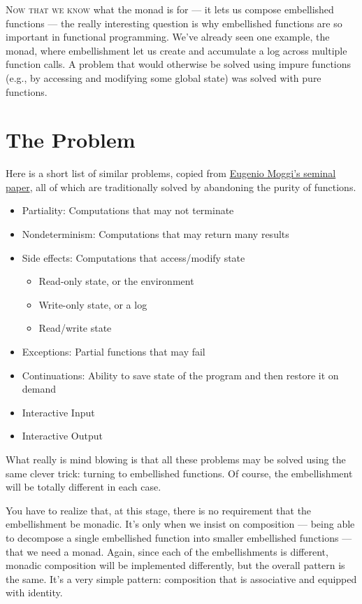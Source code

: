 \lettrine[lhang=0.17]{N}{ow that we know} what the monad is for --- it lets us compose
embellished functions --- the really interesting question is why
embellished functions are so important in functional programming. We've
already seen one example, the  monad, where embellishment
let us create and accumulate a log across multiple function calls. A
problem that would otherwise be solved using impure functions (e.g., by
accessing and modifying some global state) was solved with pure
functions.

\section{The Problem}\label{the-problem}

Here is a short list of similar problems, copied from
\href{https://core.ac.uk/download/pdf/21173011.pdf}{Eugenio Moggi's
seminal paper}, all of which are traditionally solved by abandoning the
purity of functions.

\begin{itemize}
\tightlist
\item
  Partiality: Computations that may not terminate
\item
  Nondeterminism: Computations that may return many results
\item
  Side effects: Computations that access/modify state

  \begin{itemize}
  \tightlist
  \item
    Read-only state, or the environment
  \item
    Write-only state, or a log
  \item
    Read/write state
  \end{itemize}
\item
  Exceptions: Partial functions that may fail
\item
  Continuations: Ability to save state of the program and then restore
  it on demand
\item
  Interactive Input
\item
  Interactive Output
\end{itemize}

What really is mind blowing is that all these problems may be solved
using the same clever trick: turning to embellished functions. Of
course, the embellishment will be totally different in each case.

You have to realize that, at this stage, there is no requirement that
the embellishment be monadic. It's only when we insist on composition
--- being able to decompose a single embellished function into smaller
embellished functions --- that we need a monad. Again, since each of the
embellishments is different, monadic composition will be implemented
differently, but the overall pattern is the same. It's a very simple
pattern: composition that is associative and equipped with identity.

